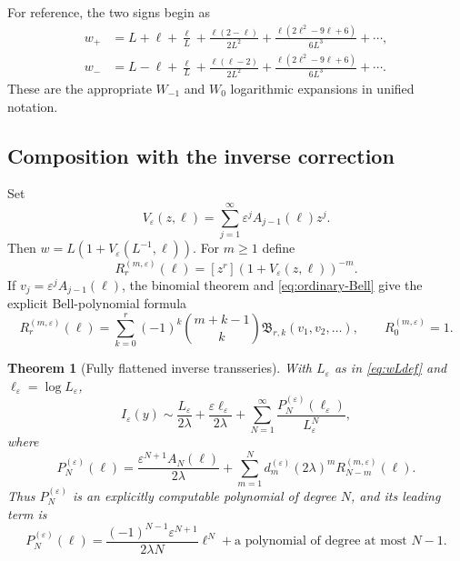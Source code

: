 \documentclass[11pt]{article}
\newtheorem{theorem}{Theorem}[section]
\theoremstyle{definition}
\theoremstyle{remark}
\newcommand{\eps}{\varepsilon}
\newcommand{\lam}{\lambda}
\newcommand{\BellOrd}{\mathfrak B}
\begin{document}
For reference, the two signs begin as
\begin{align*}
 w_+&=L+\ell+\frac\ell L+\frac{\ell(2-\ell)}{2L^2}
 +\frac{\ell(2\ell^2-9\ell+6)}{6L^3}+\cdots,\\
 w_-&=L-\ell+\frac\ell L+\frac{\ell(\ell-2)}{2L^2}
 +\frac{\ell(2\ell^2-9\ell+6)}{6L^3}+\cdots.
\end{align*}
These are the appropriate $W_{-1}$ and $W_0$ logarithmic expansions in unified notation.

\subsection{Composition with the inverse correction}

Set
\begin{equation}\label{eq:Vdef}
 V_\eps(z,\ell)=\sum_{j=1}^\infty
 \eps^jA_{j-1}(\ell)z^j.
\end{equation}
Then $w=L(1+V_\eps(L^{-1},\ell))$.  For $m\ge1$ define
\begin{equation}\label{eq:Rdef}
 R_r^{(m,\eps)}(\ell)
 =[z^r](1+V_\eps(z,\ell))^{-m}.
\end{equation}
If $v_j=\eps^jA_{j-1}(\ell)$, the binomial theorem and \eqref{eq:ordinary-Bell} give the explicit Bell-polynomial formula
\begin{equation}\label{eq:Rbell}
 R_r^{(m,\eps)}(\ell)=
 \sum_{k=0}^{r}(-1)^k\binom{m+k-1}{k}
 \BellOrd_{r,k}(v_1,v_2,\ldots),
 \qquad R_0^{(m,\eps)}=1.
\end{equation}

\begin{theorem}[Fully flattened inverse transseries]\label{thm:flattened}
With $L_\eps$ as in \eqref{eq:wLdef} and $\ell_\eps=\log L_\eps$,
\begin{equation}\label{eq:flattened-main}
 I_\eps(y)\sim
 \frac{L_\eps}{2\lam}+\frac{\eps\ell_\eps}{2\lam}
 +\sum_{N=1}^\infty\frac{P_N^{(\eps)}(\ell_\eps)}{L_\eps^N},
\end{equation}
where
\begin{equation}\label{eq:Pgeneral}
 P_N^{(\eps)}(\ell)=
 \frac{\eps^{N+1}A_N(\ell)}{2\lam}
 +\sum_{m=1}^{N}d_m^{(\eps)}(2\lam)^m
 R_{N-m}^{(m,\eps)}(\ell).
\end{equation}
Thus $P_N^{(\eps)}$ is an explicitly computable polynomial of degree $N$, and its leading term is
\begin{equation}\label{eq:Pleading}
 P_N^{(\eps)}(\ell)=
 \frac{(-1)^{N-1}\eps^{N+1}}{2\lam N}\ell^N
 +\text{a polynomial of degree at most $N-1$}.
\end{equation}
\end{theorem}
\end{document}
